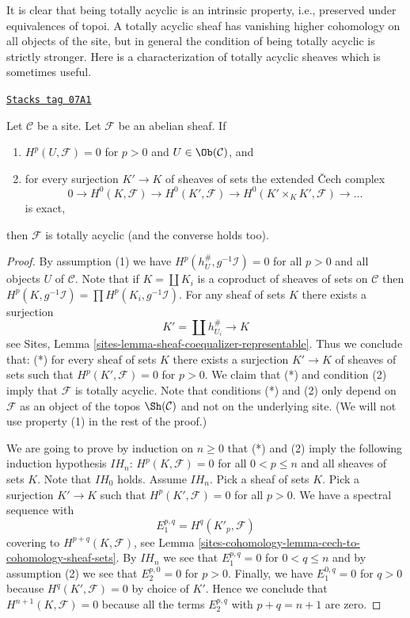 It is clear that being totally acyclic is an intrinsic property, i.e.,
preserved under equivalences of topoi.
A totally acyclic sheaf has vanishing higher cohomology on all objects
of the site, but in general the condition of being totally acyclic
is strictly stronger.
Here is a characterization of totally acyclic sheaves which is sometimes useful.

\begin{lemma}
\label{sites-cohomology-lemma-characterize-limp}
\href{https://stacks.math.columbia.edu/tag/07A1}{\texttt{Stacks tag 07A1}}

Let $\mathcal{C}$ be a site. Let $\mathcal{F}$ be an abelian sheaf. If
\begin{enumerate}
\item $H^p(U, \mathcal{F}) = 0$ for $p > 0$ and $U \in \Ob(\mathcal{C})$, and
\item for every surjection $K' \to K$ of sheaves of sets the
extended {\v C}ech complex
$$
0 \to H^0(K, \mathcal{F}) \to H^0(K', \mathcal{F}) \to
H^0(K' \times_K K', \mathcal{F}) \to \ldots
$$
is exact,
\end{enumerate}
then $\mathcal{F}$ is totally acyclic (and the converse holds too).
\end{lemma}

\begin{proof}
By assumption (1) we have $H^p(h_U^\#, g^{-1}\mathcal{I}) = 0$ for all
$p > 0$ and all objects $U$ of $\mathcal{C}$. Note that if
$K = \coprod K_i$ is a coproduct of sheaves of sets on $\mathcal{C}$
then $H^p(K, g^{-1}\mathcal{I}) = \prod H^p(K_i, g^{-1}\mathcal{I})$.
For any sheaf of sets $K$ there exists a surjection
$$
K' = \coprod h_{U_i}^\# \longrightarrow K
$$
see Sites, Lemma \ref{sites-lemma-sheaf-coequalizer-representable}.
Thus we conclude that: (*) for every sheaf of sets $K$ there exists a
surjection $K' \to K$ of sheaves of sets such that $H^p(K', \mathcal{F}) = 0$
for $p > 0$. We claim that (*) and condition (2) imply that $\mathcal{F}$
is totally acyclic.
Note that conditions (*) and (2) only depend on $\mathcal{F}$ as an
object of the topos $\Sh(\mathcal{C})$ and not on the underlying site.
(We will not use property (1) in the rest of the proof.)

\medskip\noindent
We are going to prove by induction on $n \geq 0$ that (*) and (2)
imply the following induction hypothesis $IH_n$:
$H^p(K, \mathcal{F}) = 0$ for all $0 < p \leq n$ and
all sheaves of sets $K$. Note that $IH_0$ holds. Assume $IH_n$. Pick
a sheaf of sets $K$. Pick a surjection $K' \to K$ such that
$H^p(K', \mathcal{F}) = 0$ for all $p > 0$. We have a
spectral sequence with
$$
E_1^{p, q} = H^q(K'_p, \mathcal{F})
$$
covering to $H^{p + q}(K, \mathcal{F})$, see
Lemma \ref{sites-cohomology-lemma-cech-to-cohomology-sheaf-sets}.
By $IH_n$ we see that $E_1^{p, q} = 0$ for $0 < q \leq n$ and by
assumption (2) we see that $E_2^{p, 0} = 0$ for $p > 0$. Finally, we have
$E_1^{0, q} = 0$ for $q > 0$ because $H^q(K', \mathcal{F}) = 0$ by
choice of $K'$. Hence we conclude that $H^{n + 1}(K, \mathcal{F}) = 0$
because all the terms $E_2^{p, q}$ with $p + q = n + 1$ are zero.
\end{proof}

